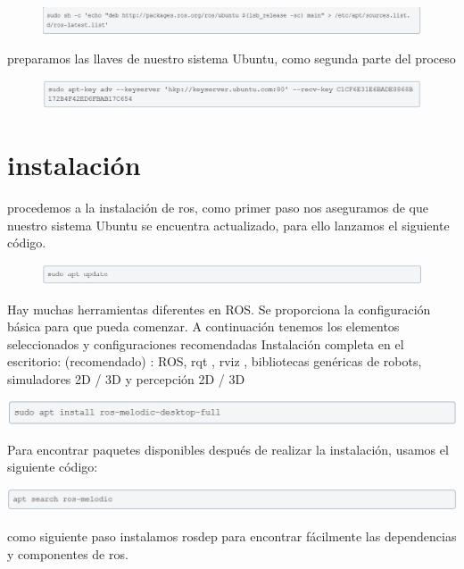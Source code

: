 \documentclass[12pt,a4paper]{report}
\begin{document}
\begin{figure}[h]
\includegraphics[scale=.8]{link1.png}
\end{figure}

preparamos las llaves de nuestro sistema Ubuntu, como segunda parte del proceso

\begin{figure}[h]
\includegraphics[scale=.8]{link11.png}
\end{figure}

\section{instalación}
procedemos a la instalación de ros, como primer paso nos aseguramos de que nuestro sistema Ubuntu se encuentra actualizado, para ello lanzamos el siguiente código.
\begin{figure}[h]
\includegraphics[scale=.8]{link20.png}
\end{figure}
Hay muchas herramientas diferentes en ROS. Se proporciona la configuración básica para que pueda comenzar. 
A continuación tenemos los elementos seleccionados y configuraciones recomendadas
Instalación completa en el escritorio: (recomendado) : ROS, rqt , rviz , bibliotecas genéricas de robots, simuladores 2D / 3D y percepción 2D / 3D\\

\begin{center}
\includegraphics[scale=.8]{link13.png}
\end{center}

Para encontrar paquetes disponibles después de realizar la instalación, usamos el siguiente código:

\begin{center}
\includegraphics[scale=.8]{link15.png}
\end{center}
como siguiente paso instalamos rosdep para encontrar fácilmente las dependencias y componentes de ros.
\end{document}
